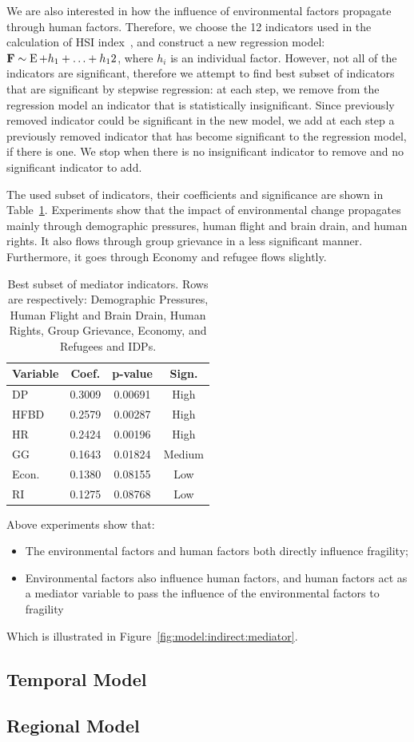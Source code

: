 We are also interested in how the influence of environmental factors propagate through human factors. Therefore, we choose the 12 indicators used in the calculation of HSI index~, and construct a new regression model: $\operatorname*{\mathbf{F}}\sim\operatorname*{E}+h_1+\ldots+h_12$, where $h_i$ is an individual factor. However, not all of the indicators are significant, therefore we attempt to find best subset of indicators that are significant by stepwise regression: at each step, we remove from the regression model an indicator that is statistically insignificant. Since previously removed indicator could be significant in the new model, we add at each step a previously removed indicator that has become significant to the regression model, if there is one. We stop when there is no insignificant indicator to remove and no significant indicator to add. 

The used subset of indicators, their coefficients and significance are shown in Table~\ref{tab:exp:mediator:subset}.
Experiments show that the impact of environmental change propagates mainly through demographic pressures, human flight and brain drain, and human rights. It also flows through group grievance in a less significant manner. Furthermore, it goes through Economy and refugee flows slightly. 

\begin{table}[htbp]
   \centering 
   \begin{tabular}{|l|ccc|} \hline
      Variable & Coef. & p-value & Sign. \\ \hline 
       DP & 0.3009 & 0.00691 & High \\ \hline
       HFBD & 0.2579 & 0.00287 & High \\ \hline
       HR & 0.2424 & 0.00196 & High \\ \hline
       GG & 0.1643 & 0.01824 & Medium \\ \hline
       Econ. & 0.1380 & 0.08155 & Low \\ \hline
       RI & 0.1275 & 0.08768 & Low \\ \hline
   \end{tabular}
   \caption{Best subset of mediator indicators. Rows are respectively: Demographic Pressures, Human Flight and Brain Drain, Human Rights, Group Grievance, Economy, and Refugees and IDPs.}
   \label{tab:exp:mediator:subset}
\end{table}

 Above experiments show that:
\begin{itemize}
   \item The environmental factors and human factors both directly influence fragility;
   \item Environmental factors also influence human factors, and human factors act as a mediator variable to pass the influence of the environmental factors to fragility 
\end{itemize}
Which is illustrated in Figure~\ref{fig:model:indirect:mediator}. 

\subsection{Temporal Model}
\label{sec:exp:temporal}


\subsection{Regional Model}
\label{sec:exp:regional}